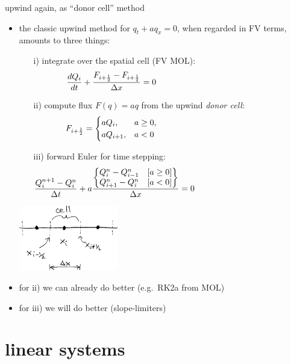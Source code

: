 \documentclass[10pt,hyperref]{beamer}
\newcommand{\Fiphalf}{{F_{i+\frac{1}{2}}}}
\begin{document}
\begin{frame}{upwind again, as ``donor cell'' method}

\begin{itemize}
\item the classic upwind method for $q_t + a q_x = 0$, when regarded in FV terms, amounts to three things:
    \begin{itemize}
    \item[i)] integrate over the spatial cell (FV MOL):
        $$\frac{dQ_i}{dt} + \frac{\Fiphalf-\Fiphalf}{\Delta x} = 0 \hspace{50mm}$$
    \item[ii)] compute flux $F(q)=aq$ from the upwind \emph{donor cell}:
        $$\Fiphalf = \begin{cases} a Q_{i}, & a \ge 0, \\
                                   a Q_{i+1}, & a < 0 \end{cases} \hspace{50mm}$$
    \item[iii)] forward Euler for time stepping:
        $$\frac{Q_i^{n+1} - Q_i^n}{\Delta t} + a \frac{\begin{Bmatrix} Q^n_{i}-Q^n_{i-1} \quad [a\ge 0] \\ Q^n_{i+1}-Q^n_{i} \quad [a<0] \end{Bmatrix}}{\Delta x} = 0 \hspace{50mm}$$
    \end{itemize}

\vspace{-30mm}

\hfill \includegraphics[width=0.34\textwidth]{figs/fvsketch}

\vspace{3mm}
\item for ii) we can already do better (e.g.~RK2a from MOL)
\item for iii) we will do better (slope-limiters)
\end{itemize}
\end{frame}



\section{linear systems}
\end{document}
